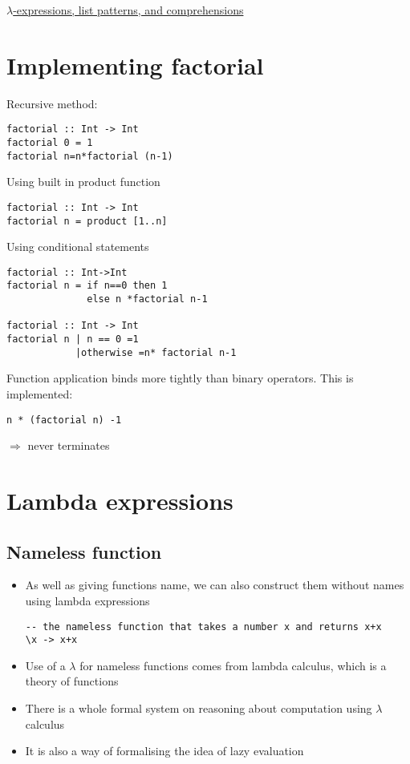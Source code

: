\documentclass{article}[18pt]
\begin{document}
\begin{center}
\underline{\huge $\lambda$-expressions, list patterns, and comprehensions}
\end{center}
\section{Implementing factorial}
Recursive method:
\begin{verbatim}
factorial :: Int -> Int
factorial 0 = 1
factorial n=n*factorial (n-1)
\end{verbatim}
Using built in product function
\begin{verbatim}
factorial :: Int -> Int
factorial n = product [1..n]
\end{verbatim}
Using conditional statements
\begin{verbatim}
factorial :: Int->Int
factorial n = if n==0 then 1
			  else n *factorial n-1

factorial :: Int -> Int
factorial n | n == 0 =1
			|otherwise =n* factorial n-1
\end{verbatim}
Function application binds more tightly than binary operators. This is implemented:
\begin{verbatim}
n * (factorial n) -1
\end{verbatim}
$\Rightarrow$ never terminates
\section{Lambda expressions}
\subsection{Nameless function}
\begin{itemize}
	\item As well as giving functions name, we can also construct them without names using lambda expressions
	\begin{verbatim}
-- the nameless function that takes a number x and returns x+x
\x -> x+x
	\end{verbatim}
	\item Use of a $\lambda$ for nameless functions comes from lambda calculus, which is a theory of functions
	\item There is a whole formal system on reasoning about computation using $\lambda$ calculus
	\item It is also a way of formalising the idea of lazy evaluation
	
\end{itemize}
\end{document}
